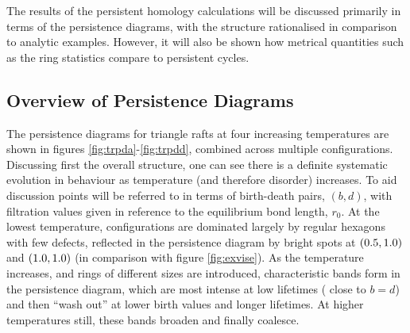 The results of the persistent homology calculations will be discussed primarily in terms of the persistence diagrams, with the structure rationalised in comparison to analytic examples. 
However, it will also be shown how metrical quantities such as the ring statistics compare to persistent cycles.

\subsection{Overview of Persistence Diagrams}

The persistence diagrams for triangle rafts at four increasing temperatures are shown in figures \ref{fig:trpda}\--\ref{fig:trpdd}, combined across multiple configurations.
Discussing first the overall structure, one can see there is a definite systematic evolution in behaviour as temperature (and therefore disorder) increases.
To aid discussion points will be referred to in terms of birth\--death pairs, $\left(b,d\right)$, with filtration values given in reference to the equilibrium bond length, $r_0$.
At the lowest temperature, configurations are dominated largely by regular hexagons with few defects, reflected in the persistence diagram by bright spots at $\left(0.5,1.0\right)$ and $\left(1.0,1.0\right)$ (in comparison with figure \ref{fig:exvise}).
As the temperature increases, and rings of different sizes are introduced, characteristic bands form in the persistence diagram, which are most intense at low lifetimes (\ie{} close to $b=d$) and then ``wash out'' at lower birth values and longer lifetimes. 
At higher temperatures still, these bands broaden and finally coalesce.

